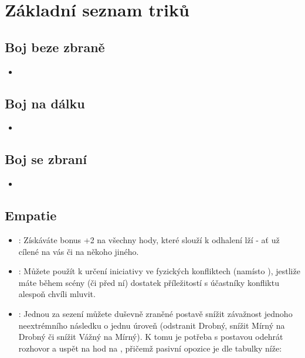 \section{Základní seznam triků}
\label{sec:trik-zakladni}

\subsection{Boj beze zbraně}
\label{sec:trik-bbz}
\begin{itemize}
  \item
\end{itemize}
  
\subsection{Boj na dálku}
\label{sec:trik-bnd}
\begin{itemize}
  \item
\end{itemize}
  
\subsection{Boj se zbraní}
\label{sec:trik-bsz}
\begin{itemize}
  \item
\end{itemize}

\subsection{Empatie}
\label{sec:trik-empatie}

\begin{itemize}
\item{}:
\label{sec:empatie-odhalovani} Získáváte bonus +2 na všechny hody, které slouží k odhalení lží - ať už cílené na vás či na někoho jiného.

\item{}:
\label{sec:empatie-cit} Můžete použít  k určení iniciativy ve fyzických konfliktech (namísto ), jestliže máte během scény (či před ní) dostatek příležitostí s účastníky konfliktu alespoň chvíli mluvit.

\item{}:
\label{sec:empatie-terapuet} Jednou za sezení můžete duševně zraněné postavě snížit závažnost jednoho neextrémního následku o jednu úroveň (odstranit Drobný, snížit Mírný na Drobný či snížit Vážný na Mírný). K tomu je potřeba s postavou odehrát rozhovor a uspět na hod na , přičemž pasivní opozice je dle tabulky níže:
\end{itemize}

